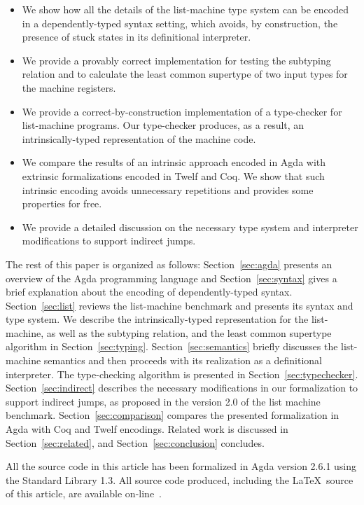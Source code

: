 \documentclass[review]{elsarticle}
\theoremstyle{definition}
\begin{document}
\begin{itemize}
  \item We show how all the details of the list-machine type system
        can be encoded in a dependently-typed syntax setting, which avoids, by construction,
        the presence of stuck states in its definitional interpreter.
  \item We provide a provably correct implementation for testing the subtyping
        relation and to calculate the least common supertype of two input
        types for the machine registers.
  \item We provide a correct-by-construction implementation of a type-checker for
        list-machine programs. Our type-checker produces, as a result, an intrinsically-typed
        representation of the machine code.
  \item We compare the results of an intrinsic approach encoded in Agda with extrinsic
        formalizations encoded in Twelf and Coq. We show that such intrinsic encoding avoids
        unnecessary repetitions and provides some properties for free.
  \item We provide a detailed discussion on the necessary type system and interpreter modifications
        to support indirect jumps.
\end{itemize}

The rest of this paper is organized as follows: Section~\ref{sec:agda} presents an overview of
the Agda programming language and Section~\ref{sec:syntax}
gives a brief explanation about the encoding of dependently-typed syntax. Section~\ref{sec:list}
reviews the list-machine benchmark and presents its syntax and type system.
We describe the intrinsically-typed representation for the list-machine, as well as
the subtyping relation, and the least common supertype algorithm in Section~\ref{sec:typing}.
Section~\ref{sec:semantics} briefly discusses the list-machine semantics and
then proceeds with its realization as a definitional interpreter.
The type-checking algorithm is presented in Section~\ref{sec:typechecker}.
Section~\ref{sec:indirect} describes the necessary modifications in our formalization to
support indirect jumps, as proposed in the version 2.0 of the list machine benchmark.
Section~\ref{sec:comparison}
compares the presented formalization in Agda with Coq and Twelf encodings. Related work is
discussed in Section~\ref{sec:related}, and Section~\ref{sec:conclusion} concludes.

All the source code in this article has been formalized in Agda
version 2.6.1 using the Standard Library 1.3. All source code produced,
including the \LaTeX~source of this article, are available
on-line~\cite{list-rep}.
\end{document}
